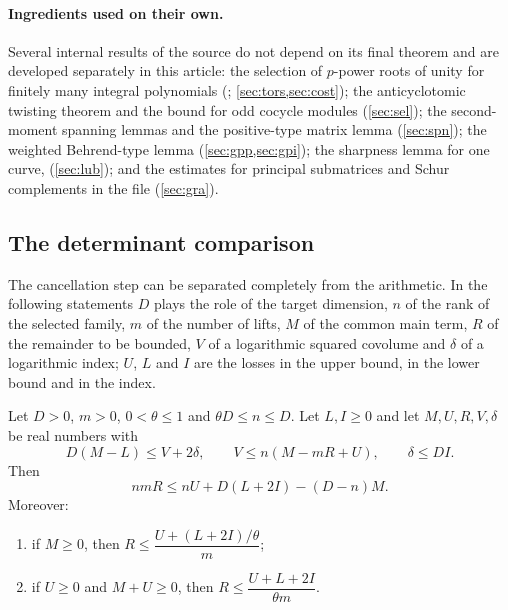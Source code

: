 \paragraph{Ingredients used on their own.}
Several internal results of the source do not depend on its final theorem and are developed
separately in this article: the selection of $p$-power roots of unity for finitely many
integral polynomials (; \cref{sec:tors,sec:cost}); the anticyclotomic
twisting theorem and the bound  for odd cocycle modules
(\cref{sec:sel}); the second-moment spanning lemmas and the positive-type matrix lemma
 (\cref{sec:spn}); the weighted Behrend-type lemma
 (\cref{sec:gpp,sec:gpi}); the sharpness lemma for one curve,
 (\cref{sec:lub}); and the estimates for principal
submatrices and Schur complements in the file 
(\cref{sec:gra}).

\subsection{The determinant comparison}\label{src:sec:comparison}
\begingroup\raggedright
{}
\endgroup

The cancellation step can be separated completely from the arithmetic. In the following
statements $D$ plays the role of the target dimension, $n$ of the rank of the selected family,
$m$ of the number of lifts, $M$ of the common main term, $R$ of the remainder to be bounded,
$V$ of a logarithmic squared covolume and $\delta$ of a logarithmic index; $U$, $L$ and $I$
are the losses in the upper bound, in the lower bound and in the index.

\begin{proposition}\label{src:prop:amplification}
Let $D>0$, $m>0$, $0<\theta\le1$ and $\theta D\le n\le D$. Let $L,I\ge0$ and let
$M,U,R,V,\delta$ be real numbers with
\begin{equation}\label{src:eq:sandwich}
D(M-L)\le V+2\delta,\qquad V\le n(M-mR+U),\qquad \delta\le DI .
\end{equation}
Then
\begin{equation}\label{src:eq:amp-exact}
nmR\le nU+D(L+2I)-(D-n)M .
\end{equation}
Moreover:
\begin{enumerate}[label=\textup{(\roman*)}]
\item if $M\ge0$, then $R\le\dfrac{U+(L+2I)/\theta}{m}$;
\item if $U\ge0$ and $M+U\ge0$, then $R\le\dfrac{U+L+2I}{\theta m}$.
\end{enumerate}
\end{proposition}

